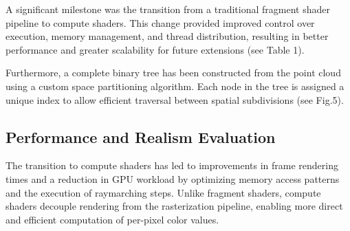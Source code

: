 \documentclass{rapportcs}
\begin{document}
        A significant milestone was the transition from a traditional fragment shader pipeline to compute shaders. This change provided improved control over execution, memory management, and thread distribution, resulting in better performance and greater scalability for future extensions (see Table 1).

        \begin{table}[h]
            \centering
            \caption{Comparison between fragment shader and compute shader}
        \end{table}

        Furthermore, a complete binary tree has been constructed from the point cloud using a custom space partitioning algorithm. Each node in the tree is assigned a unique index to allow efficient traversal between spatial subdivisions (see Fig.5).

    \newpage

    \subsection{Performance and Realism Evaluation}
    
        The transition to compute shaders has led to improvements in frame rendering times and a reduction in GPU workload by optimizing memory access patterns and the execution of raymarching steps. Unlike fragment shaders, compute shaders decouple rendering from the rasterization pipeline, enabling more direct and efficient computation of per-pixel color values.\\
        
\end{document}

